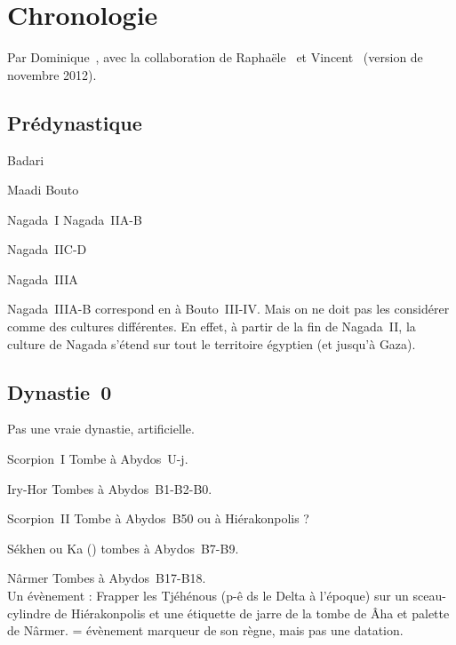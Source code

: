 
\chapter{Chronologie}

Par Dominique~, avec la collaboration de 
Raphaële~ et Vincent~ 
(version de novembre 2012).

\section{Prédynastique}

\begin{listerois}
  \item [\HE Badari \datation{(4500-3800)}] ~\\
  \item [\BE Maadi Bouto \datation{(environ 4000-3400)}]
  \item [\HE Nagada~I Nagada~IIA-B \datation{(environ 3800-3600)}]
  \item [\HE Nagada~IIC-D \datation{(environ 3600-3300)}]
  \item [\HE Nagada~IIIA \datation{(environ 3300-3250)}]
\end{listerois}

Nagada~IIIA-B correspond en \BE à Bouto~III-IV. Mais on ne doit pas 
les considérer comme des cultures différentes. En effet, à partir de 
la fin de Nagada~II, la culture de Nagada s'étend sur tout le 
territoire égyptien (et jusqu'à Gaza).

\section{Dynastie~0}

Pas une vraie dynastie, artificielle.


\begin{listerois}
  \item [\og Scorpion~I \fg] Tombe à Abydos~U-j.
  \item [Iry-Hor] Tombes à Abydos~B1-B2-B0.
  \item [Scorpion~\og II \fg] Tombe à Abydos~B50 ou à Hiérakonpolis ?
  \item [Sékhen ou Ka (\nospace{?})] tombes à Abydos~B7-B9.
  \item [Nârmer] Tombes à Abydos~B17-B18. \\
        Un évènement : \og Frapper les Tjéhénous \fg (p-ê ds le Delta 
        à l'époque) sur un sceau-cylindre de Hiérakonpolis et une
        étiquette de jarre de la tombe de Âha et palette de Nârmer.
        = évènement marqueur de son règne, mais pas une datation.
\end{listerois}

